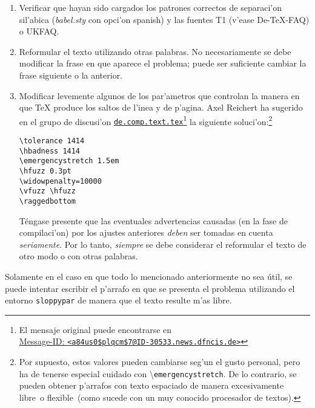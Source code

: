 \documentclass[11pt,a4paper,pagesize,tablecaptionabove,abstracton,pointlessnumbers]{scrartcl}
\newcommand{\News}[1]{\href{news:#1}{\texttt{#1}}}
\newcommand{\MID}[2]{\href{http://groups.google.com/groups?as_umsgid=#1}%
    {Message-ID: \texttt{<#2>}}}
\newcommand{\News}[1]{\href{news:#1}{\texttt{#1}}}
\newcommand{\MID}[2]{\href{M-ID: <#1>}{Message-ID: \texttt{<#2>}}}
\newcommand{\gl}{\guillemotleft}
\newcommand{\gr}{\guillemotright}
\newcommand{\TB}{\textbackslash}
\newcommand{\Doku}[1]{\textsf{#1}\xspace}
\newcommand{\Paket}[1]{\textsf{\textsl{#1.sty}}\xspace}
\newcommand{\Option}[1]{\textsf{#1}\xspace}
\begin{document}
\begin{enumerate}
  \item Verificar que hayan sido cargados los patrones correctos de separaci'on sil'abica (\Paket{babel} con opci'on \Option{spanish}) y las fuentes T1 (v'ease \Doku{De-TeX-FAQ}\cite[secci'on 5.3]{faq:02}) o \Doku{UKFAQ}\cite[\textit{Hyphenation}, secci'on Q.7]{ukfaq:99}.

  \item Reformular el texto utilizando otras palabras. No necesariamente se debe modificar la frase en que aparece el problema; puede ser suficiente cambiar la frase siguiente o la anterior.

  \item Modificar levemente algunos de los par'ametros que controlan la manera en que \TeX{} produce los saltos de l'inea y de p'agina. Axel Reichert ha sugerido en el grupo de discusi'on \News{de.comp.text.tex}\footnote{El mensaje original puede encontrarse en\\     \MID{a84us0$plqcm$7@ID-30533.news.dfncis.de}{a84us0\$plqcm\$7@ID-30533.news.dfncis.de}} la siguiente soluci'on:\footnote{Por supuesto, estos valores pueden cambiarse seg'un el gusto personal, pero ha de tenerse especial cuidado con \TB\texttt{emergencystretch}. De lo contrario, se pueden obtener p'arrafos con texto espaciado de manera excesivamente \gl libre\gr\ o \gl flexible\gr\ (como sucede con un muy conocido procesador de textos).}

  \begin{minipage}[t]{\linewidth}
  \begin{verbatim}
\tolerance 1414
\hbadness 1414
\emergencystretch 1.5em
\hfuzz 0.3pt
\widowpenalty=10000
\vfuzz \hfuzz
\raggedbottom
  \end{verbatim}
  \end{minipage}
  \par

  Téngase presente que las eventuales advertencias causadas (en la fase de compilaci'on) por los ajustes anteriores \emph{deben} ser tomadas en cuenta \emph{seriamente}. Por lo tanto, \emph{siempre} se debe considerar el reformular el texto de otro modo o con otras palabras.
\end{enumerate}
%
Solamente en el caso en que todo lo mencionado anteriormente no sea útil, se puede intentar escribir el p'arrafo en que se presenta el problema utilizando el entorno \texttt{sloppypar} de manera que el texto resulte m'as \gl libre\gr.
\end{document}
